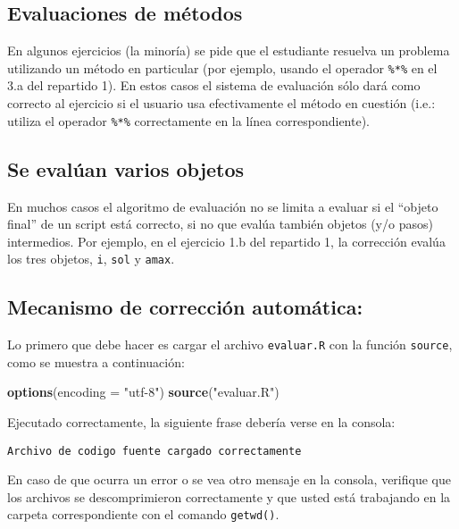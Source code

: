 \documentclass[]{article}
\newenvironment{Shaded}{}{}
\newcommand{\KeywordTok}[1]{\textcolor[rgb]{0.00,0.44,0.13}{\textbf{{#1}}}}
\newcommand{\DataTypeTok}[1]{\textcolor[rgb]{0.56,0.13,0.00}{{#1}}}
\newcommand{\StringTok}[1]{\textcolor[rgb]{0.25,0.44,0.63}{{#1}}}
\newcommand{\NormalTok}[1]{{#1}}
\begin{document}
\subsection{Evaluaciones de métodos}

En algunos ejercicios (la minoría) se pide que el estudiante resuelva un
problema utilizando un método en particular (por ejemplo, usando el
operador \texttt{\%*\%} en el 3.a del repartido 1). En estos casos el
sistema de evaluación sólo dará como correcto al ejercicio si el usuario
usa efectivamente el método en cuestión (i.e.: utiliza el operador
\texttt{\%*\%} correctamente en la línea correspondiente).

\subsection{Se evalúan varios objetos}

En muchos casos el algoritmo de evaluación no se limita a evaluar si el
``objeto final'' de un script está correcto, si no que evalúa también
objetos (y/o pasos) intermedios. Por ejemplo, en el ejercicio 1.b del
repartido 1, la corrección evalúa los tres objetos, \texttt{i},
\texttt{sol} y \texttt{amax}.

\subsection{Mecanismo de corrección automática:}

Lo primero que debe hacer es cargar el archivo \texttt{evaluar.R} con la
función \texttt{source}, como se muestra a continuación:

\begin{Shaded}
\begin{Highlighting}[]
\KeywordTok{options}\NormalTok{(}\DataTypeTok{encoding =} \StringTok{"utf-8"}\NormalTok{)}
\KeywordTok{source}\NormalTok{(}\StringTok{"evaluar.R"}\NormalTok{)}
\end{Highlighting}
\end{Shaded}
Ejecutado correctamente, la siguiente frase debería verse en la consola:

\begin{verbatim}
Archivo de codigo fuente cargado correctamente
\end{verbatim}
En caso de que ocurra un error o se vea otro mensaje en la consola,
verifique que los archivos se descomprimieron correctamente y que usted
está trabajando en la carpeta correspondiente con el comando
\texttt{getwd()}.
\end{document}
